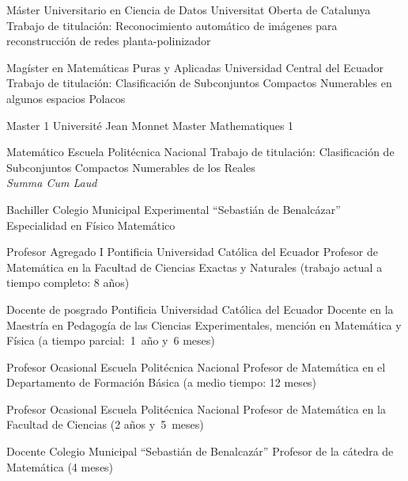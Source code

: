 \documentclass[
	a4paper,
	maincolor=cvblue!70!blue,
	sidecolor=gray!30,
	sectioncolor=cvblue!70!blue,
    sidebarwidth=7.5cm,
	topbottommargin=20pt,
	leftrightmargin=20pt,
]{fortysecondscv}
\begin{document}
\makefrontsidebar

    {Máster Universitario en Ciencia de Datos}
    {Universitat Oberta de Catalunya}
    {\hspace{0pt}\\[-1mm] Trabajo de titulación: Reconocimiento automático de imágenes para reconstrucción de redes planta-polinizador\\[-1.5mm]}

    {Magíster en Matemáticas Puras y Aplicadas}
    {Universidad Central del Ecuador}
    {\hspace{0pt}\\[-1mm] Trabajo de titulación: Clasificación de Subconjuntos Compactos Numerables en algunos espacios Polacos}

    {Master 1}
    {Université Jean Monnet}
    {Master Mathematiques 1}
    
    {Matemático}
    {Escuela Politécnica Nacional}
    {Trabajo de titulación: Clasificación de Subconjuntos Compactos Numerables de los Reales\\ \textit{Summa Cum Laud}}
    
    {Bachiller}
    {Colegio Municipal Experimental ``Sebastián de Benalcázar''}
    {Especialidad en Físico Matemático}

    {Profesor Agregado I}
    {Pontificia Universidad Católica del Ecuador}
    {Profesor de Matemática en la Facultad de Ciencias Exactas y Naturales (trabajo actual a tiempo completo: 8 años)}
    
    {Docente de posgrado}
    {Pontificia Universidad Católica del Ecuador}
    {Docente en la Maestría en Pedagogía de las Ciencias Experimentales, mención en Matemática y Física (a tiempo parcial:~1~año y~6 meses)}

    {Profesor Ocasional}
    {Escuela Politécnica Nacional}
    {Profesor de Matemática en el Departamento de Formación Básica (a medio tiempo: 12 meses)}

    {Profesor Ocasional}
    {Escuela Politécnica Nacional}
    {Profesor de Matemática en la Facultad de Ciencias (2 años y~5~meses)}

    {Docente}
    {Colegio Municipal ``Sebastián de Benalcazár''}
    {Profesor de la cátedra de Matemática (4 meses)}
\end{document}

